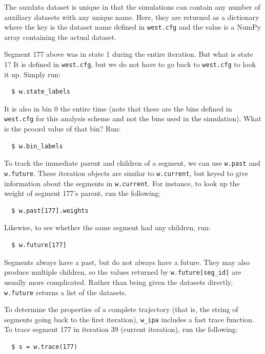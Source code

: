 The auxdata dataset is unique in that the simulations can contain any number of auxiliary datasets with any unique name. 
Here, they are returned as a dictionary where the key is the dataset name defined in \verb|west.cfg| and the value is a NumPy array containing the actual dataset.

Segment 177 above was in state 1 during the entire iteration. 
But what is state 1? 
It is defined in \verb|west.cfg|, but we do not have to go back to \verb|west.cfg| to look it up. 
Simply run:
\begin{verbatim}
  $ w.state_labels
\end{verbatim}

It is also in bin 0 the entire time (note that these are the bins defined in \verb|west.cfg| for this analysis scheme and not the bins used in the simulation). 
What is the pcoord value of that bin? Run:

\begin{verbatim}
  $ w.bin_labels
\end{verbatim}

To track the immediate parent and children of a segment, we can use \verb|w.past| and \verb|w.future|. 
These iteration objects are similar to \verb|w.current|, but keyed to give information about the segments in \verb|w.current|. 
For instance, to look up the weight of segment 177’s parent, run the following:

\begin{verbatim}
  $ w.past[177].weights
\end{verbatim}

Likewise, to see whether the same segment had any children, run:

\begin{verbatim}
  $ w.future[177]
\end{verbatim}


Segments always have a past, but do not always have a future. 
They may also produce multiple children, so the values returned by \verb|w.future[seg_id]| are usually more complicated. 
Rather than being given the datasets directly, \verb|w.future| returns a list of the datasets.

To determine the properties of a complete trajectory (that is, the string of segments going back to the first iteration), \verb|w_ipa| includes a fast trace function. 
To trace segment 177 in iteration 39 (current iteration), run the following:
\begin{verbatim}
  $ s = w.trace(177)
\end{verbatim}

